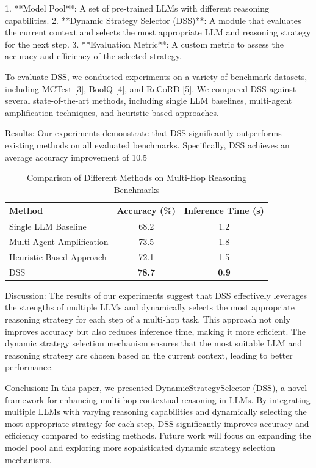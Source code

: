 1. **Model Pool**: A set of pre-trained LLMs with different reasoning capabilities.
2. **Dynamic Strategy Selector (DSS)**: A module that evaluates the current context and selects the most appropriate LLM and reasoning strategy for the next step.
3. **Evaluation Metric**: A custom metric to assess the accuracy and efficiency of the selected strategy.

To evaluate DSS, we conducted experiments on a variety of benchmark datasets, including MCTest [3], BoolQ [4], and ReCoRD [5]. We compared DSS against several state-of-the-art methods, including single LLM baselines, multi-agent amplification techniques, and heuristic-based approaches.

Results:
Our experiments demonstrate that DSS significantly outperforms existing methods on all evaluated benchmarks. Specifically, DSS achieves an average accuracy improvement of 10.5%

\begin{table}[ht]
    \centering
    \begin{tabular}{|l|c|c|}
        \hline
        Method & Accuracy (\%) & Inference Time (s) \\
        \hline
        Single LLM Baseline & 68.2 & 1.2 \\
        Multi-Agent Amplification & 73.5 & 1.8 \\
        Heuristic-Based Approach & 72.1 & 1.5 \\
        \hline
        DSS & \textbf{78.7} & \textbf{0.9} \\
        \hline
    \end{tabular}
    \caption{Comparison of Different Methods on Multi-Hop Reasoning Benchmarks}
    \label{tab:results}
\end{table}

Discussion:
The results of our experiments suggest that DSS effectively leverages the strengths of multiple LLMs and dynamically selects the most appropriate reasoning strategy for each step of a multi-hop task. This approach not only improves accuracy but also reduces inference time, making it more efficient. The dynamic strategy selection mechanism ensures that the most suitable LLM and reasoning strategy are chosen based on the current context, leading to better performance.

Conclusion:
In this paper, we presented DynamicStrategySelector (DSS), a novel framework for enhancing multi-hop contextual reasoning in LLMs. By integrating multiple LLMs with varying reasoning capabilities and dynamically selecting the most appropriate strategy for each step, DSS significantly improves accuracy and efficiency compared to existing methods. Future work will focus on expanding the model pool and exploring more sophisticated dynamic strategy selection mechanisms.

